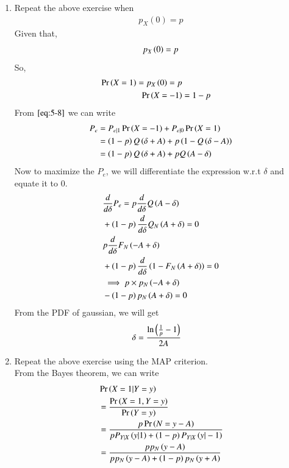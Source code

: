 \documentclass[journal,12pt,twocolumn]{IEEEtran}
\renewcommand\thesection{\arabic{section}}
\begin{document}
\begin{enumerate}[label=\thesection.\arabic*,ref=\thesection.\theenumi]
\begin{enumerate}[label=\thesection.\arabic*
,ref=\thesection.\theenumi]
\item Repeat the above exercise when
	\begin{align}
		p_{X}(0) = p
	\end{align}
 \solution Given that,
         \begin{align}
		 p_{X}\left(0\right) = p
         \end{align}
	 So,
	 \begin{align}
           \Pr\left(X = 1\right) = p_{X}\left(0\right) = p\\
           \Pr\left(X = -1\right) &= 1 - p
         \end{align}		 
   From $\eqref{eq:5-8}$ we can write
         \begin{align}
             P_e &= P_{e|1}\Pr\left(X = -1\right) + P_{e|0}\Pr\left(X=1\right) \\
		 &= \left(1-p\right)Q\left(\delta + A\right) + p\left(1 - Q\left(\delta - A\right)\right)\\
		 &= \left(1-p\right)Q\left(\delta + A\right) + pQ\left(A - \delta\right)
         \end{align}
   Now to maximize the $P_e$, we will differentiate the expression w.r.t $\delta$ and equate it to $0$.
         \begin{align}
          &\frac{d}{d\delta}P_e=p\frac{d}{d\delta} Q\left(A -\delta\right)\nonumber \\
          &+\left(1-p\right)\frac{d}{d\delta} Q_N\left(A+\delta\right)=0\\
          &p\frac{d}{d\delta} F_N\left(-A+\delta\right)\nonumber \\
          &+\left(1-p\right)\frac{d}{d\delta}\left(1-F_N\left(A+\delta\right)\right)=0\\
          &\implies p\times p_N\left(-A+\delta\right)\\
          &-\left(1-p\right)p_N\left(A+\delta\right)=0
         \end{align}     
  From the PDF of gaussian, we will get
         \begin{align}
		 \delta &= \frac{\ln\left(\frac{1}{p} - 1\right)}{2A}
         \end{align}
\item Repeat the above exercise using the MAP criterion.\\
  \solution From the Bayes theorem, we can write
       \begin{align}
	          &\pr{X=1|Y=y}  \\
	          &= \frac{\pr{X=1,Y=y}}{\pr{Y=y}}\\
		      &= \frac{p\pr{N = y -A}}{pP_{Y|X}\brak{y|1} +\brak{1-p}P_{Y|X}\brak{y|-1}}\\
		      &= \frac{p p_{N}\brak{y-A}}{pp_{N}\brak{y-A} + \brak{1-p}p_{N}\brak{y+A}}\\

\end{align}
\end{enumerate}
\end{enumerate}
\end{document}
